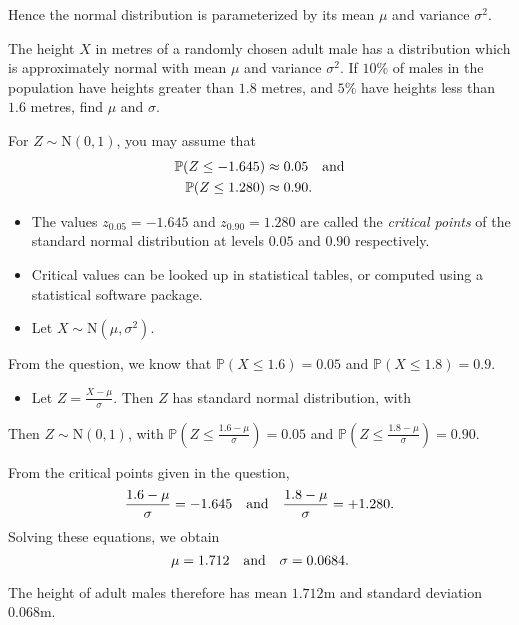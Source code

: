 \documentclass[lecture]{csm}
\newcommand{\prob}{\mathbb{P}}
\def\it{\item}
\def\bit{\begin{itemize}}
\def\eit{\end{itemize}}
\begin{document}
Hence the normal distribution is parameterized by its mean $\mu$ and variance $\sigma^2$.

\newpage

\begin{example}
The height $X$ in metres of a randomly chosen adult male has a distribution which is approximately normal with mean $\mu$ and variance $\sigma^2$. If $10\%$ of males in the population have heights greater than $1.8$ metres, and $5\%$ have heights less than $1.6$ metres, find $\mu$ and $\sigma$. 

\vspace{2ex}
For $Z\sim\text{N}(0,1)$, you may assume that
\begin{align*}
\prob(Z\leq -1.645)	& \approx 0.05 \text{\quad and} \\
\prob(Z\leq 1.280)	& \approx 0.90.
\end{align*}
\bit
\it The values $z_{0.05} = -1.645$ and $z_{0.90} = 1.280$ are called the \emph{critical points} of the standard normal distribution at levels $0.05$ and $0.90$ respectively. 
\it Critical values can be looked up in statistical tables, or computed using a statistical software package.
\eit

%
\end{example}

\newpage

\begin{solution}
\bit
\it Let $X\sim\text{N}(\mu,\sigma^2)$. 
\eit
From the question, we know that $\prob(X\leq 1.6) = 0.05$ and $\prob(X\leq 1.8)=0.9$.
\bit
\it Let $Z=\displaystyle\frac{X-\mu}{\sigma}$. Then $Z$ has standard normal distribution, with%
\eit
Then $Z\sim\text{N}(0,1)$, with
$\prob\left(Z\leq \displaystyle\frac{1.6-\mu}{\sigma}\right) = 0.05$ and
$\prob\left(Z\leq \displaystyle\frac{1.8-\mu}{\sigma}\right) = 0.90$.

\vspace{2ex}
From the critical points given in the question,
\[
\displaystyle\frac{1.6-\mu}{\sigma} = -1.645 \text{\quad and\quad} \displaystyle\frac{1.8-\mu}{\sigma} = +1.280.
\]
Solving these equations, we obtain
\[
\mu=1.712 \text{\quad and\quad} \sigma=0.0684.
\]

The height of adult males therefore has mean $1.712$m and standard deviation $0.068$m.
\end{solution}
\end{document}
